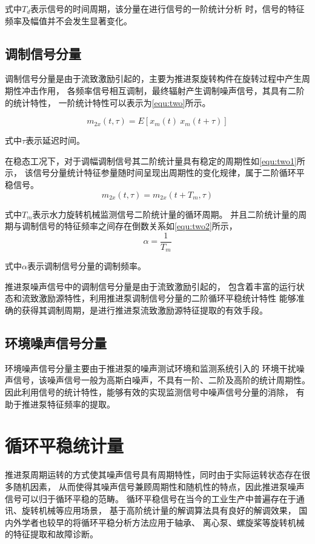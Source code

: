 式中$T_{d}$表示信号的时间周期，该分量在进行信号的一阶统计分析
时，信号的特征频率及幅值并不会发生显著变化。
\subsection{调制信号分量}
调制信号分量是由于流致激励引起的，主要为推进泵旋转构件在旋转过程中产生周期性冲击作用，
各频率信号相互调制，最终辐射产生调制噪声信号，其具有二阶的统计特性，
一阶统计特性可以表示为\autoref{equ:two}所示。

\begin{equation}
    \label{equ:two}
    m_{2x}\left ( t, \tau \right )  =E\left [ x_{m}\left ( t \right ) \ x_{m}\left ( t+\tau \right )  \right ] 
\end{equation}

式中$\tau$表示延迟时间。

在稳态工况下，对于调幅调制信号其二阶统计量具有稳定的周期性如\autoref{equ:two1}所示，
该信号分量统计特征参量随时间呈现出周期性的变化规律，属于二阶循环平稳信号。
\begin{equation}
    \label{equ:two1}
    m_{2x}\left ( t, \tau \right )  =m_{2x}\left ( t+T_m, \tau \right )
\end{equation}

式中$T_m$表示水力旋转机械监测信号二阶统计量的循环周期。
并且二阶统计量的周期与调制信号的特征频率之间存在倒数关系如\autoref{equ:two2}所示，
\begin{equation}
    \label{equ:two2}
    \alpha =\frac{1}{T_{m} } 
\end{equation}

式中$\alpha$表示调制信号分量的调制频率。 

推进泵噪声信号中的调制信号分量是由于流致激励引起的，
包含着丰富的运行状态和流致激励源特性，利用推进泵调制信号分量的二阶循环平稳统计特性
能够准确的获得其调制周期，是进行推进泵流致激励源特征提取的有效手段。
\subsection{环境噪声信号分量}
环境噪声信号分量主要由于推进泵的噪声测试环境和监测系统引入的
环境干扰噪声信号，该噪声信号一般为高斯白噪声，不具有一阶、二阶及高阶的统计周期性。
因此利用信号的统计特性，能够有效的实现监测信号中噪声信号分量的消除，
有助于推进泵特征频率的提取。

\section{循环平稳统计量}
推进泵周期运转的方式使其噪声信号具有周期特性，同时由于实际运转状态存在很多随机因素，
从而使得其噪声信号兼顾周期性和随机性的特点，因此推进泵噪声信号可以归于循环平稳的范畴。
循环平稳信号在当今的工业生产中普遍存在于通讯、旋转机械等应用场景，
基于高阶统计量的解调算法具有良好的解调效果，
国内外学者也较早的将循环平稳分析方法应用于轴承、
离心泵、螺旋桨等旋转机械的特征提取和故障诊断。
